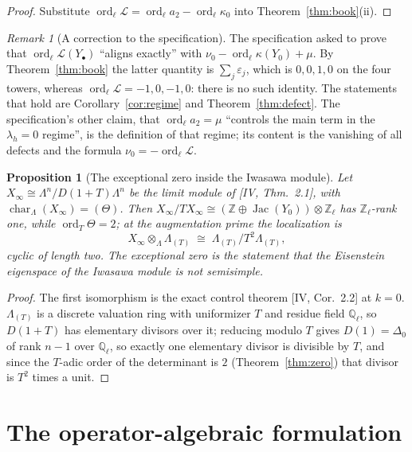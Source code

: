 \documentclass[11pt]{amsart}
\numberwithin{equation}{section}
\newtheorem{proposition}[theorem]{Proposition}
\theoremstyle{definition}
\theoremstyle{remark}
\newtheorem{remark}[theorem]{Remark}
\newcommand{\Z}{\mathbb{Z}}
\newcommand{\Q}{\mathbb{Q}}
\newcommand{\Zl}{\Z_\ell}
\newcommand{\Ql}{\Q_\ell}
\newcommand{\La}{\Lambda}
\newcommand{\cL}{\mathcal{L}}
\newcommand{\Jac}{\operatorname{Jac}}
\newcommand{\ord}{\operatorname{ord}}
\newcommand{\car}{\operatorname{char}_{\La}}
\begin{document}
\begin{proof}
Substitute $\ord_\ell\cL=\ord_\ell a_2-\ord_\ell\kappa_0$ into
Theorem~\ref{thm:book}(ii).
\end{proof}

\begin{remark}[A correction to the specification]\label{rem:align}
The specification asked to prove that $\ord_\ell\cL(Y_\bullet)$ ``aligns exactly'' with
$\nu_0-\ord_\ell\kappa(Y_0)+\mu$. By Theorem~\ref{thm:book} the latter quantity is
$\sum_j\varepsilon_j$, which is $0,0,1,0$ on the four towers, whereas
$\ord_\ell\cL=-1,0,-1,0$: there is no such identity. The statements that hold are
Corollary~\ref{cor:regime} and Theorem~\ref{thm:defect}. The specification's other
claim, that $\ord_\ell a_2=\mu$ ``controls the main term in the $\lambda_h=0$ regime'',
is the definition of that regime; its content is the vanishing of all defects and the
formula $\nu_0=-\ord_\ell\cL$.
\end{remark}

\begin{proposition}[The exceptional zero inside the Iwasawa module]\label{prop:module}
Let $X_\infty\cong\La^{n}/D(1+T)\La^{n}$ be the limit module of {\rm[IV, Thm.~2.1]}, with
$\car(X_\infty)=(\Theta)$. Then $X_\infty/TX_\infty\cong(\Z\oplus\Jac(Y_0))\otimes\Zl$
has $\Zl$-rank one, while $\ord_T\Theta=2$; at the augmentation prime the localization
is
\[
X_\infty\otimes_{\La}\La_{(T)}\;\cong\;\La_{(T)}\big/T^{2}\La_{(T)} ,
\]
cyclic of length two. The exceptional zero is the statement that the Eisenstein
eigenspace of the Iwasawa module is not semisimple.
\end{proposition}

\begin{proof}
The first isomorphism is the exact control theorem [IV, Cor.~2.2] at $k=0$.
$\La_{(T)}$ is a discrete valuation ring with uniformizer $T$ and residue field $\Ql$,
so $D(1+T)$ has elementary divisors over it; reducing modulo $T$ gives
$D(1)=\Delta_0$ of rank $n-1$ over $\Ql$, so exactly one elementary divisor is divisible
by $T$, and since the $T$-adic order of the determinant is $2$
(Theorem~\ref{thm:zero}) that divisor is $T^{2}$ times a unit.
\end{proof}

\section{The operator-algebraic formulation}\label{sec:oa}
\end{document}
